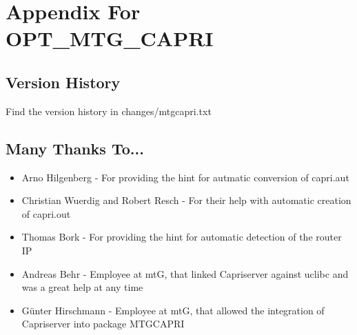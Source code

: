 \section {Appendix For OPT\_MTG\_CAPRI}
\subsection{Version History}
    Find the version history in changes/mtgcapri.txt
\subsection{Many Thanks To...}

    \begin{itemize}
        \item Arno Hilgenberg - For providing the hint for autmatic conversion of capri.aut
        \item Christian Wuerdig and Robert Resch - For their help with automatic creation of capri.out
        \item Thomas Bork - For providing the hint for automatic detection of the router IP
        \item Andreas Behr - Employee at mtG, that linked Capriserver against uclibc and was a great help at any time
        \item Günter Hirschmann - Employee at mtG, that allowed the integration of Capriserver into package MTGCAPRI
    \end{itemize}

